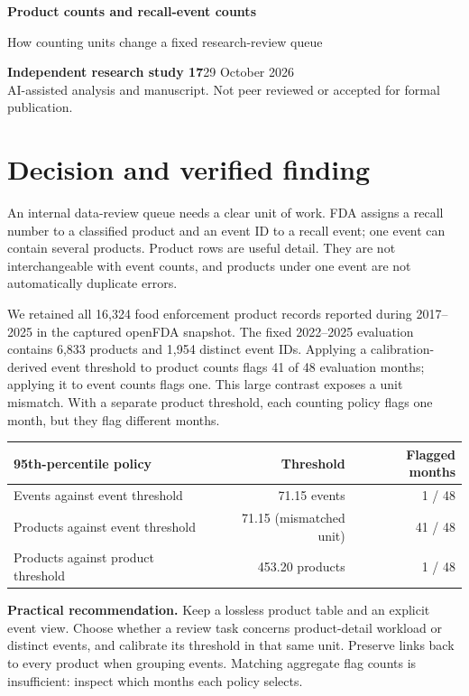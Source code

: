 \documentclass[10pt,letterpaper]{article}
\begin{document}
\color{ink}
{\LARGE\bfseries Product counts and recall-event counts\par}
{\large How counting units change a fixed research-review queue\par}
\textbf{Independent research study 17}\hfill 29 October 2026\\
AI-assisted analysis and manuscript. Not peer reviewed or accepted for formal publication.

\section*{Decision and verified finding}
An internal data-review queue needs a clear unit of work. FDA assigns a recall number to a classified product and an event ID to a recall event; one event can contain several products. Product rows are useful detail. They are not interchangeable with event counts, and products under one event are not automatically duplicate errors.

We retained all 16,324 food enforcement product records reported during 2017--2025 in the captured openFDA snapshot. The fixed 2022--2025 evaluation contains 6,833 products and 1,954 distinct event IDs. Applying a calibration-derived event threshold to product counts flags 41 of 48 evaluation months; applying it to event counts flags one. This large contrast exposes a unit mismatch. With a separate product threshold, each counting policy flags one month, but they flag different months.

\begin{center}\begin{tabularx}{\linewidth}{Xrr}\toprule
95th-percentile policy & Threshold & Flagged months\\\midrule
Events against event threshold & 71.15 events & 1 / 48\\
Products against event threshold & 71.15 (mismatched unit) & 41 / 48\\
Products against product threshold & 453.20 products & 1 / 48\\\bottomrule
\end{tabularx}\end{center}

\textbf{Practical recommendation.} Keep a lossless product table and an explicit event view. Choose whether a review task concerns product-detail workload or distinct events, and calibrate its threshold in that same unit. Preserve links back to every product when grouping events. Matching aggregate flag counts is insufficient: inspect which months each policy selects.
\end{document}
